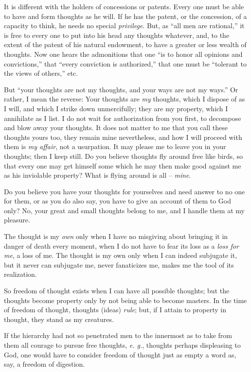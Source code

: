 \documentclass[12pt,a4paper]{book}
\begin{document}
It is different with the holders of concessions or patents. Every one must be 
able to have and form thoughts as he will. If he has the patent, or the 
concession, of a capacity to think, he needs no special \textit{privilege}. 
But, as ``all men are rational,'' it is free to every one to put into his 
head any thoughts whatever, and, to the extent of the patent of his natural 
endowment, to have a greater or less wealth of thoughts. Now one hears the 
admonitions that one ``is to honor all opinions and convictions,'' that 
``every conviction is authorized,'' that one must be ``tolerant to the 
views of others,'' etc.

But ``your thoughts are not my thoughts, and your ways are not my ways.'' Or 
rather, I mean the reverse: Your thoughts are \textit{my} thoughts, which I 
dispose of as I will, and which I strike down unmercifully; they are my 
property, which I annihilate as I list. I do not wait for authorization from 
you first, to decompose and blow away your thoughts. It does not matter to me 
that you call these thoughts yours too, they remain mine nevertheless, and how 
I will proceed with them is \textit{my affair}, not a usurpation. It may 
please me to leave you in your thoughts; then I keep still. Do you believe 
thoughts fly around free like birds, so that every one may get himself some 
which he may then make good against me as his inviolable property? What is 
flying around is all -- \textit{mine}.

Do you believe you have your thoughts for yourselves and need answer to no one 
for them, or as you do also say, you have to give an account of them to God 
only? No, your great and small thoughts belong to me, and I handle them at my 
pleasure.

The thought is my \textit{own} only when I have no misgiving about bringing it 
in danger of death every moment, when I do not have to fear its loss as a 
\textit{loss for me}, a loss of me. The thought is my own only when I can 
indeed subjugate it, but it never can subjugate me, never fanaticizes me, 
makes me the tool of its realization.

So freedom of thought exists when I can have all possible thoughts; but the 
thoughts become property only by not being able to become masters. In the time 
of freedom of thought, thoughts (ideas) \textit{rule}; but, if I attain to 
property in thought, they stand as my creatures.

If the hierarchy had not so penetrated men to the innermost as to take from 
them all courage to pursue free thoughts, \textit{e. g.}, thoughts perhaps 
displeasing to God, one would have to consider freedom of thought just as 
empty a word as, say, a freedom of digestion.
\end{document}
